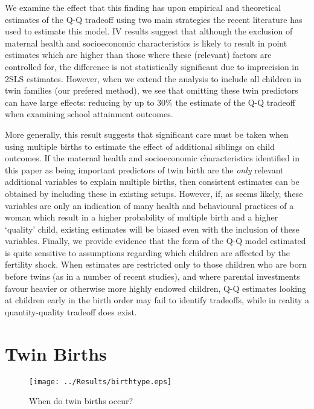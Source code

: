 \documentclass{article}[11pt,subeqn]
\begin{document}
\begin{spacing}{1.5}
We examine the effect that this finding has upon empirical and theoretical estimates of the Q-Q tradeoff using two main strategies the recent literature has used to estimate
this model.  IV results suggest that although the exclusion of maternal health and socioeconomic characteristics is likely to result in point estimates which are higher than
those where these (relevant) factors are controlled for, the difference is not statistically significant due to imprecision in 2SLS estimates.  However, when we extend the
analysis to include all children in twin families (our prefered method), we see that omitting these twin predictors can have large effects: reducing by up to 30\% the estimate of
the Q-Q tradeoff when examining school attainment outcomes.

More generally, this result suggests that significant care must be taken when using multiple births to estimate the effect of additional siblings on child outcomes.  If the
maternal health and socioeconomic characteristics identified in this paper as being important predictors of twin birth are the \emph{only} relevant additional variables to
explain multiple births, then consistent estimates can be obtained by including these in existing setups.  However, if, as seems likely, these variables are only an indication
of many health and behavioural practices of a woman which result in a higher probability of multiple birth and a higher `quality' child, existing estimates will be biased even
with the inclusion of these variables.  Finally, we provide evidence that the form of the Q-Q model estimated is quite sensitive to assumptions regarding which children are
affected by the fertility shock.  When estimates are restricted only to those children who are born before twins (as in a number of recent studies), and where parental 
investments favour heavier or otherwise more highly endowed children, Q-Q estimates looking at children early in the birth order may fail to identify tradeoffs, while in reality
a quantity-quality tradeoff does exist.


\newpage


\newpage
\appendix
\section{Twin Births}
\begin{figure}[!htbp]
\caption{When do twin births occur?}
\label{fig:birthtype}
\begin{center}
\texttt{[image: ../Results/birthtype.eps]}
\end{center}	
\end{figure}


\end{spacing}
\end{document}
